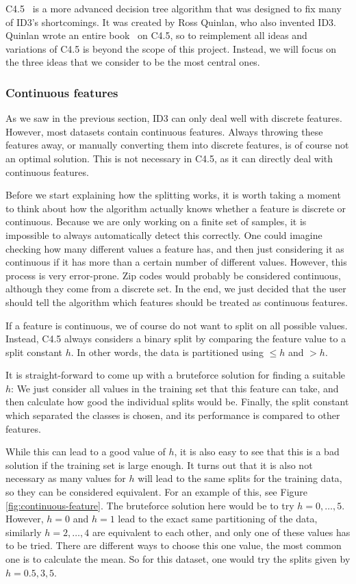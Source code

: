 \documentclass[a4paper]{article}
\begin{document}
C4.5~\cite{wu2008top, quinlan2014c4, mitchell1997machine} is a more advanced decision tree algorithm that was designed to fix many of ID3's shortcomings. It was created by Ross Quinlan, who also invented ID3. Quinlan wrote an entire book~\cite{quinlan2014c4} on C4.5, so to reimplement all ideas and variations of C4.5 is beyond the scope of this project. Instead, we will focus on the three ideas that we consider to be the most central ones.

\subsubsection{Continuous features}

As we saw in the previous section, ID3 can only deal well with discrete features. However, most datasets contain continuous features. Always throwing these features away, or manually converting them into discrete features, is of course not an optimal solution. This is not necessary in C4.5, as it can directly deal with continuous features.

Before we start explaining how the splitting works, it is worth taking a moment to think about how the algorithm actually knows whether a feature is discrete or continuous. Because we are only working on a finite set of samples, it is impossible to always automatically detect this correctly. One could imagine checking how many different values a feature has, and then just considering it as continuous if it has more than a certain number of different values. However, this process is very error-prone. Zip codes would probably be considered continuous, although they come from a discrete set. In the end, we just decided that the user should tell the algorithm which features should be treated as continuous features.

If a feature is continuous, we of course do not want to split on all possible values. Instead, C4.5 always considers a binary split by comparing the feature value to a split constant $h$. In other words, the data is partitioned using $\le h$ and $> h$.

It is straight-forward to come up with a bruteforce solution for finding a suitable $h$: We just consider all values in the training set that this feature can take, and then calculate how good the individual splits would be. Finally, the split constant which separated the classes is chosen, and its performance is compared to other features.

While this can lead to a good value of $h$, it is also easy to see that this is a bad solution if the training set is large enough. It turns out that it is also not necessary as many values for $h$ will lead to the same splits for the training data, so they can be considered equivalent. For an example of this, see Figure \ref{fig:continuous-feature}. The bruteforce solution here would be to try $h = 0, \dots, 5$. However, $h = 0$ and $h = 1$ lead to the exact same partitioning of the data, similarly $h = 2, \dots, 4$ are equivalent to each other, and only one of these values has to be tried. There are different ways to choose this one value, the most common one is to calculate the mean. So for this dataset, one would try the splits given by $h = 0.5, 3, 5$.
\end{document}
